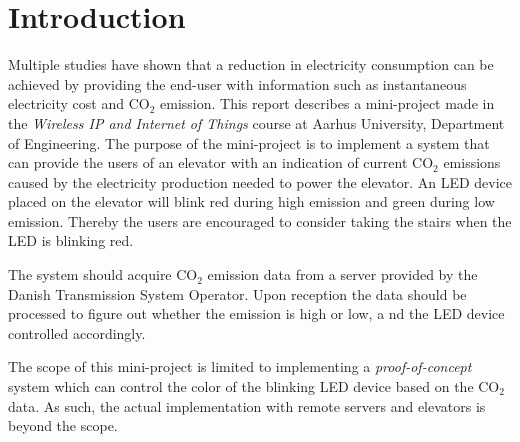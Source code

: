 \documentclass[Main]{subfiles}
\begin{document}
\section*{Introduction} %
\label{sec:introduction}
	Multiple studies have shown that a reduction in electricity consumption can be achieved by providing the end-user with information such as instantaneous electricity cost and CO$_2$ emission\cite{Tricascade:2009:Online}. 
	This report describes a mini-project made in the \emph{Wireless IP and Internet of Things} course at Aarhus University, Department of Engineering. 
	The purpose of the mini-project is to implement a system that can provide the users of an elevator with an indication of current CO$_2$ emissions caused by the electricity production needed to power the elevator. 
	An LED device placed on the elevator will blink red during high emission and green during low emission. 
	Thereby the users are encouraged to consider taking the stairs when the LED is blinking red. 

	The system should acquire CO$_2$ emission data from a server provided by the Danish Transmission System Operator. 
	Upon reception the data should be processed to figure out whether the emission is high or low, a nd the LED device controlled accordingly.

	The scope of this mini-project is limited to implementing a \emph{proof-of-concept} system which can control the color of the blinking LED device based on the CO$_2$ data.
	As such, the actual implementation with remote servers and elevators is beyond the scope.



\end{document}
